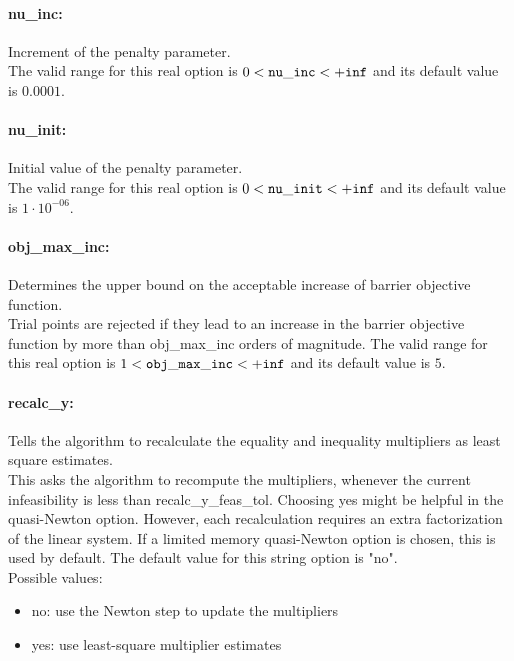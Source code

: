 \paragraph{nu\_inc:}\label{sec:nu_inc} Increment of the penalty parameter. $\;$ \\
 The valid range for this real option is 
$0 <  {\tt nu\_inc } <  {\tt +inf}$
and its default value is $0.0001$.


\paragraph{nu\_init:}\label{sec:nu_init} Initial value of the penalty parameter. $\;$ \\
 The valid range for this real option is 
$0 <  {\tt nu\_init } <  {\tt +inf}$
and its default value is $1 \cdot 10^{-06}$.


\paragraph{obj\_max\_inc:}\label{sec:obj_max_inc} Determines the upper bound on the acceptable increase of barrier objective function. $\;$ \\
 Trial points are rejected if they lead to an
increase in the barrier objective function by
more than obj\_max\_inc orders of magnitude. The valid range for this real option is 
$1 <  {\tt obj\_max\_inc } <  {\tt +inf}$
and its default value is $5$.


\paragraph{recalc\_y:}\label{sec:recalc_y} Tells the algorithm to recalculate the equality and inequality multipliers as least square estimates. $\;$ \\
 This asks the algorithm to recompute the
multipliers, whenever the current infeasibility
is less than recalc\_y\_feas\_\-tol. Choosing yes
might be helpful in the quasi-Newton option. 
However, each recalculation requires an extra
factorization of the linear system.  If a limited
memory quasi-Newton option is chosen, this is
used by default.
The default value for this string option is "no".
\\ 
Possible values:
\begin{itemize}
   \item no: use the Newton step to update the multipliers
   \item yes: use least-square multiplier estimates
\end{itemize}

